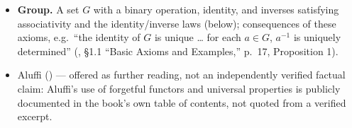 \begin{itemize}
\tightlist
\item
  \textbf{Group.} A set \(G\) with a binary operation, identity, and inverses satisfying associativity and the identity/inverse laws (below); consequences of these axioms, e.g.~``the identity of \(G\) is unique \ldots{} for each \(a \in G\), \(a^{-1}\) is uniquely determined'' (\cite{DummitFoote2003}, §1.1 ``Basic Axioms and Examples,'' p.~17, Proposition 1).
\item
  Aluffi (\cite{Aluffi2009}) --- offered as further reading, not an independently verified factual claim: Aluffi's use of forgetful functors and universal properties is publicly documented in the book's own table of contents, not quoted from a verified excerpt.
\end{itemize}
